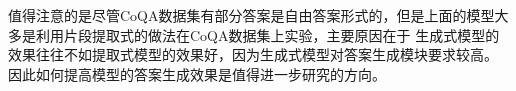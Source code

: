 




值得注意的是尽管CoQA数据集有部分答案是自由答案形式的，但是上面的模型大多是利用片段提取式的做法在CoQA数据集上实验，主要原因在于
生成式模型的效果往往不如提取式模型的效果好，因为生成式模型对答案生成模块要求较高。
因此如何提高模型的答案生成效果是值得进一步研究的方向。